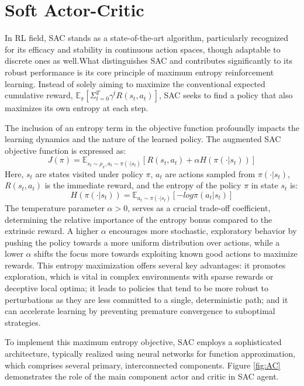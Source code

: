\section{Soft Actor-Critic}
\label{sec:sac}
In \gls{RL} field, \gls{SAC} stands as a state-of-the-art algorithm, particularly recognized for its efficacy and stability in continuous action spaces, though adaptable to discrete ones as well.What distinguishes \gls{SAC} and contributes significantly to its robust performance is its core principle of maximum entropy reinforcement learning. Instead of solely aiming to maximize the conventional expected cumulative reward, \(\mathbb{E}_\pi[\Sigma_{t=0}^T \gamma^t R(s_t, a_t)]\), \gls{SAC} seeks to find a policy that also maximizes its own entropy at each step.

The inclusion of an entropy term in the objective function profoundly impacts the learning dynamics and the nature of the learned policy. The augmented \gls{SAC} objective function is expressed as:
\[J(\pi) = \mathbb{E}_{s_t \sim \rho_\pi, a_t \sim \pi(\cdot|s_t)} [R(s_t, a_t) + \alpha H(\pi(\cdot|s_t))]\]
Here, \(s_t\) are states visited under policy \(\pi\), \(a_t\) are actions sampled from \(\pi(\cdot|s_t)\), \(R(s_t, a_t)\) is the immediate reward, and the entropy of the policy \(\pi\) in state \(s_t\) is:
\[H(\pi(\cdot|s_t)) = \mathbb{E}_{a_t \sim \pi(\cdot|s_t)}[-log \pi(a_t|s_t)]\] 
The temperature parameter \(\alpha > 0\), serves as a crucial trade-off coefficient, determining the relative importance of the entropy bonus compared to the extrinsic reward. A higher \(\alpha\) encourages more stochastic, exploratory behavior by pushing the policy towards a more uniform distribution over actions, while a lower \(\alpha\) shifts the focus more towards exploiting known good actions to maximize rewards. This entropy maximization offers several key advantages: it promotes exploration, which is vital in complex environments with sparse rewards or deceptive local optima; it leads to policies that tend to be more robust to perturbations as they are less committed to a single, deterministic path; and it can accelerate learning by preventing premature convergence to suboptimal strategies.

To implement this maximum entropy objective, \gls{SAC} employs a sophisticated architecture, typically realized using neural networks for function approximation, which comprises several primary, interconnected components. Figure \ref{fig:AC} demonstrates the role of the main component actor and critic in \gls{SAC} agent.

